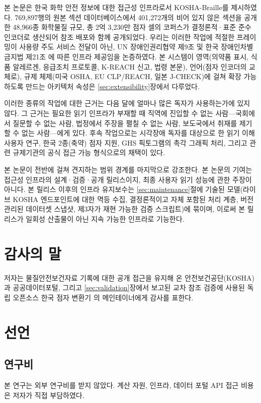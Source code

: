 \documentclass[journal]{IEEEtran}
\begin{document}
본 논문은 한국 화학 안전 정보에 대한 접근성 인프라로서 KOSHA-Braille를 제시하였다. 769{,}897행의 원본 섹션 데이터베이스에서 401{,}272개의 비어 있지 않은 섹션을 공개한 48{,}966종 화학물질 규모, 총 2억 3{,}230만 점자 셀의 코퍼스가 결정론적·표준 준수 인코더로 생산되어 참조 배포와 함께 공개되었다. 우리는 이러한 작업에 적절한 프레이밍이 사용량 주도 서비스 전달이 아닌, UN 장애인권리협약 제9조 \cite{crpd} 및 한국 장애인차별금지법 제21조 \cite{kdpa}에 따른 인프라 제공임을 논증하였다. 본 시스템이 영역(의약품 표시, 식품 알레르겐, 응급조치 프로토콜, K-REACH 신고, 법령 본문), 언어(점자 인코더의 교체로), 규제 체제(미국 OSHA, EU CLP/REACH, 일본 J-CHECK)에 걸쳐 확장 가능하도록 만드는 아키텍처 속성은 \ref{sec:extensibility}장에서 다루었다.

이러한 종류의 작업에 대한 근거는 다음 달에 얼마나 많은 독자가 사용하는가에 있지 않다. 그 근거는 필요한 읽기 인프라가 부재할 때 직역에 진입할 수 없는 사람---국회에서 질문할 수 없는 사람, 법정에서 주장을 펼칠 수 없는 사람, 보도국에서 취재를 제기할 수 없는 사람---에게 있다. 후속 작업으로는 시각장애 독자를 대상으로 한 읽기 이해 사용자 연구, 한국 2종(축약) 점자 지원, GHS 픽토그램의 촉각 그래픽 처리, 그리고 관련 규제기관의 공식 접근 가능 형식으로의 채택이 있다.

본 논문이 전반에 걸쳐 견지하는 범위 경계를 마지막으로 강조한다. 본 논문의 기여는 접근성 인프라의 설계·검증·공개 릴리스이지, 최종 사용자 읽기 성능에 관한 주장이 아니다. 본 릴리스 이후의 인프라 유지보수는 \ref{sec:maintenance}절에 기술된 모델(라이브 KOSHA 엔드포인트에 대한 멱등 수집, 결정론적이고 자체 포함된 처리 계층, 버전 관리된 데이터셋 스냅샷, 제3자가 재현 가능한 검증 스크립트)에 묶이며, 이로써 본 릴리스가 일회성 산출물이 아닌 지속 가능한 인프라로 기능한다.

\section*{감사의 말}

저자는 물질안전보건자료 기록에 대한 공개 접근을 유지해 온 안전보건공단(KOSHA)과 공공데이터포털, 그리고 \ref{sec:validation}장에서 보고된 교차 참조 검증에 사용된 독립 오픈소스 한국 점자 변환기 \cite{hangul_braille_converter}의 메인테이너에게 감사를 표한다.

\section*{선언}

\subsection*{연구비}
본 연구는 외부 연구비를 받지 않았다. 계산 자원, 인프라, 데이터 포털 API 접근 비용은 저자가 직접 부담하였다.
\end{document}
